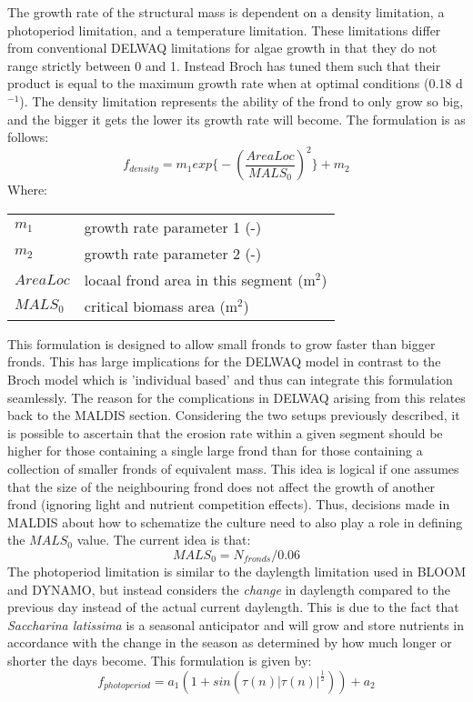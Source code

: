 \documentclass{deltares_manual}
\begin{document}
The growth rate of the structural mass is dependent on a density limitation, a photoperiod limitation, and a temperature limitation. These limitations differ from conventional DELWAQ limitations for algae growth in that they do not range strictly between 0 and 1. Instead Broch has tuned them such that their product is equal to the maximum growth rate when at optimal conditions (0.18 d$^{-1}$). The density limitation represents the ability of the frond to only grow so big, and the bigger it gets the lower its growth rate will become. The formulation is as follows:
\[f_{density} = m_1 exp\big\{-(\frac{AreaLoc}{MALS_0})^2 \big\}+m_2\] 
Where:\\
\begin{tabular}{ll}
	$m_1$    & growth rate parameter 1 (-)\\
	$m_2$    & growth rate parameter 2 (-)\\
	$AreaLoc$ & locaal frond area in this segment (m$^2$)\\
	$MALS_0$ & critical biomass area (m$^2$)\\
\end{tabular}
This formulation is designed to allow small fronds to grow faster than bigger fronds. This has large implications for the DELWAQ model in contrast to the Broch model which is 'individual based' and thus can integrate this formulation seamlessly. The reason for the complications in DELWAQ arising from this relates back to the MALDIS section. Considering the two setups previously described, it is possible to ascertain that the erosion rate within a given segment should be higher for those containing a single large frond than for those containing a collection of smaller fronds of equivalent mass. This idea is logical if one assumes that the size of the neighbouring frond does not affect the growth of another frond (ignoring light and nutrient competition effects). Thus, decisions made in MALDIS about how to schematize the culture need to also play a role in defining the $MALS_0$ value. The current idea is that: 
\[MALS_0 = N_{fronds}/0.06\]
The photoperiod limitation is similar to the daylength limitation used in BLOOM and DYNAMO, but instead considers the \textit{change} in daylength compared to the previous day instead of the actual current daylength. This is due to the fact that \textit{Saccharina latissima} is a seasonal anticipator and will grow and store nutrients in accordance with the change in the season as determined by how much longer or shorter the days become. This formulation is given by: 
\[f_{photoperiod} = a_1 (1+sin(\tau (n) | \tau (n)| ^{\frac{1}{2}})) + a_2\]
\end{document}

